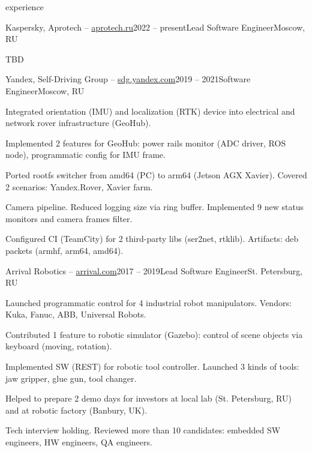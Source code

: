 \documentclass{template}
\begin{document}
\begin{rSection}{experience}
\begin{rCompany}{Kaspersky, Aprotech -- \href{https://aprotech.ru}{aprotech.ru}}{2022 -- present}{Lead Software Engineer}{Moscow, RU}

\item TBD

\end{rCompany}
\begin{rCompany}{Yandex, Self-Driving Group -- \href{https://sdg.yandex.com}{sdg.yandex.com}}{2019 -- 2021}{Software Engineer}{Moscow, RU}

\item Integrated orientation (IMU) and localization (RTK) device into electrical and network rover infrastructure (GeoHub).
\item Implemented 2 features for GeoHub: power rails monitor (ADC driver, ROS node), programmatic config for IMU frame.
\item Ported rootfs switcher from amd64 (PC) to arm64 (Jetson AGX Xavier). Covered 2 scenarios: Yandex.Rover, Xavier farm.
\item Camera pipeline. Reduced logging size via ring buffer. Implemented 9 new status monitors and camera frames filter.
\item Configured CI (TeamCity) for 2 third-party libs (ser2net, rtklib). Artifacts: deb packets (armhf, arm64, amd64).

\end{rCompany}
\begin{rCompany}{Arrival Robotics -- \href{https://arrival.com}{arrival.com}}{2017 -- 2019}{Lead Software Engineer}{St. Petersburg, RU}

\item Launched programmatic control for 4 industrial robot manipulators. Vendors: Kuka, Fanuc, ABB, Universal Robots.
\item Contributed 1 feature to robotic simulator (Gazebo): control of scene objects via keyboard (moving, rotation).
\item Implemented SW (REST) for robotic tool controller. Launched 3 kinds of tools: jaw gripper, glue gun, tool changer.
\item Helped to prepare 2 demo days for investors at local lab (St. Petersburg, RU) and at robotic factory (Banbury, UK).
\item Tech interview holding. Reviewed more than 10 candidates: embedded SW engineers, HW engineers, QA engineers.


\end{rCompany}
\end{rSection}
\end{document}
